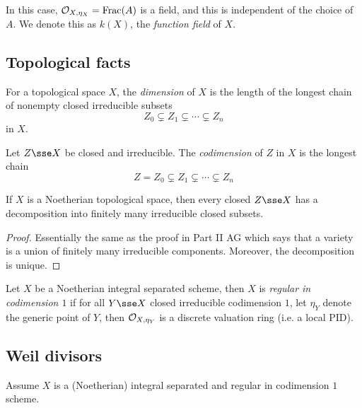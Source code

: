 \documentclass{article}
\begin{document}
In this case, \(\mathcal{O}_{X, \eta_X} = \operatorname{Frac}(A)\) is a field, and this is independent of the choice of \(A\). We denote this as \(k(X)\), the \emph{function field} of \(X\).

\subsection{Topological facts}

\begin{definition}
     For a topological space \(X\), the \emph{dimension} of \(X\) is the length of the longest chain of nonempty closed irreducible subsets
    \[Z_0 \subsetneq Z_1 \subsetneq \cdots \subsetneq Z_n\]
    in \(X\).

    Let \(Z \sse X\) be closed and irreducible. The \emph{codimension} of \(Z\) in \(X\) is the longest chain
    \[Z = Z_0 \subsetneq Z_1 \subsetneq \cdots \subsetneq Z_n\]
\end{definition}

\begin{lemma}
    If \(X\) is a Noetherian topological space, then every closed \(Z \sse X\) has a decomposition into finitely many irreducible closed subsets.
\end{lemma}

\begin{addendum}
    \begin{proof}
        Essentially the same as the proof in Part II AG which says that a variety is a union of finitely many irreducible components. Moreover, the decomposition is unique.
    \end{proof}
\end{addendum}

\begin{definition}
    Let \(X\) be a Noetherian integral separated scheme, then \(X\) is \emph{regular in codimension \(1\)} if for all \(Y \sse X\) closed irreducible codimension \(1\), let \(\eta_Y\) denote the generic point of \(Y\), then \(\mathcal{O}_{X, \eta_Y}\) is a discrete valuation ring (i.e. a local PID).
\end{definition}

\subsection{Weil divisors}

Assume \(X\) is a (Noetherian) integral separated and regular in codimension \(1\) scheme.
\end{document}
